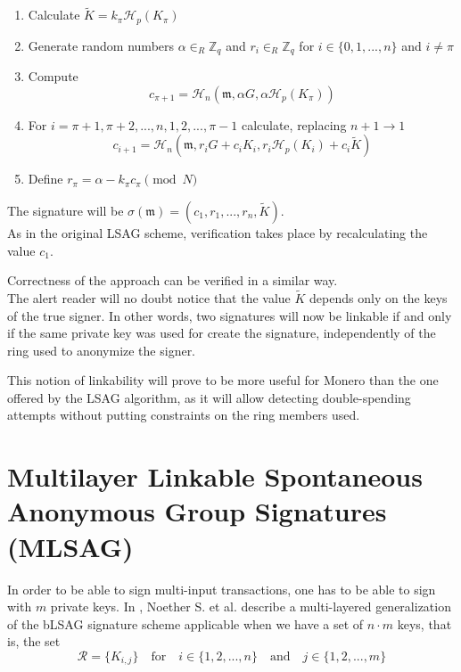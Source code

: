 \begin{enumerate}
	\item Calculate \(\tilde{K} = k_\pi \mathcal{H}_p(K_\pi)\)
	
	\item Generate random numbers \(\alpha \in_R \mathbb{Z}_q\) and  \(r_i \in_R \mathbb{Z}_q\) for \(i \in \{0, 1, ..., n\}\) and \(i \ne \pi\)
	
	\item Compute
	\[c_{\pi+1} = \mathcal{H}_n(\mathfrak{m}, \alpha G, \alpha \mathcal{H}_p(K_\pi))\]
	
	\item For \(i = \pi+1, \pi+2, ..., n, 1, 2, ..., \pi-1\) calculate, replacing \(n + 1 \rightarrow 1\)
	\[  c_{i+1} = \mathcal{H}_n(\mathfrak{m}, r_i G + c_i K_i, r_i \mathcal{H}_p(K_i) + c_i \tilde{K} )  \] 
	
	
	\item Define \(r_\pi = \alpha -k_\pi c_\pi \pmod N\)
	
\end{enumerate}

The signature will be \(\sigma(\mathfrak{m}) = (c_1, r_1, ..., r_n, \tilde{K}) \).
\\

As in the original LSAG scheme, verification takes place by recalculating the value \(c_1\).

Correctness of the approach can be verified in a similar way.
\\

The alert reader will no doubt notice that the value \(\tilde{K} \) depends only on the keys of the true signer.
In other words, two signatures will now be linkable if and only if the same private key was used for create the signature,
independently of the ring used to anonymize the signer. 

This notion of linkability will prove to be more useful for Monero than the one offered by the LSAG algorithm, as it
will allow detecting double-spending attempts without putting constraints on the ring members used.



\section{Multilayer Linkable Spontaneous Anonymous Group Signatures (MLSAG)}
\label{sec:MLSAG}

In order to be able to sign multi-input transactions, one has to be able to sign with
\(m\) private keys. In \cite{cryptoeprint:2015:1098, ledger34}, Noether S. et al. describe a multi-layered generalization of the bLSAG signature scheme applicable when we have a set of \(n \cdot m\) keys, that is, the set
\[\mathcal{R} = \{ K_{i,j} \}  \quad \textrm{for} \quad  i \in \{1, 2, ..., n\} \quad \textrm{and} \quad j \in \{1, 2, ..., m\}\] 

